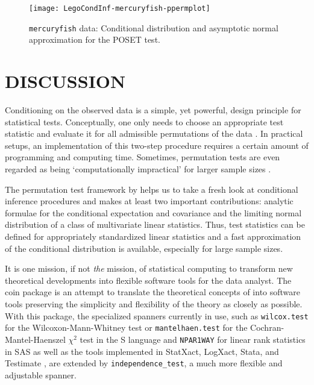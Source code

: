 \documentclass{article}
\newcommand{\Rpackage}[1]{{\normalfont\fontseries{b}\selectfont #1}}
\newcommand{\Robject}[1]{\texttt{#1}}
\newcommand{\Rcmd}[1]{\texttt{#1}}
\renewcommand{\S}{\textsf{S}}
\begin{document}
\begin{sidewaysfigure}
\begin{center}
\texttt{[image: LegoCondInf-mercuryfish-ppermplot]}
\caption{\Robject{mercuryfish} data: 
         Conditional distribution and asymptotic normal approximation 
         for the POSET test. \label{distplot}}
\end{center}
\end{sidewaysfigure}

\section{DISCUSSION}

Conditioning on the observed data is a simple, yet powerful, design
principle for statistical tests. Conceptually, one only needs to choose
an appropriate test statistic and evaluate it for all admissible 
permutations of the data \citep[][gives some examples]{Ernst2004}. 
In practical setups, an implementation of this
two-step procedure requires a certain amount of programming 
and computing time. Sometimes, permutation tests are even regarded 
as being `computationally impractical'
for larger sample sizes \citep{BalkinMallows2001}. 

The permutation test framework by \cite{StrasserWeber1999} helps us to take
a fresh look at conditional inference procedures and makes at least 
two important contributions: analytic formulae for the 
conditional expectation and covariance and the limiting normal distribution
of a class of multivariate linear statistics. Thus, test statistics can be
defined for appropriately standardized linear statistics and a fast
approximation of the conditional distribution is available, 
especially for large sample sizes. 

It is one mission, if not \textit{the} mission, of statistical computing to
transform new theoretical developments into flexible software tools for the
data analyst. The \Rpackage{coin} package is an attempt to translate 
the theoretical concepts of \cite{StrasserWeber1999} into software tools 
preserving the simplicity and flexibility of 
the theory as closely as possible. With this package, the specialized spanners
currently in use,
such as \Rcmd{wilcox.test} for the Wilcoxon-Mann-Whitney test or
\Rcmd{mantelhaen.test} for the Cochran-Mantel-Haenszel $\chi^2$ test in the 
\S{} language and \texttt{NPAR1WAY} for linear rank statistics in \textsf{SAS}
as well as the tools implemented in \textsf{StatXact}, \textsf{LogXact},
\textsf{Stata}, and \textsf{Testimate} 
\citep[see][for an overview]{Oster2002,Oster2003},
are extended by \Rcmd{independence\_test}, a much more flexible and 
adjustable spanner.
\end{document}
